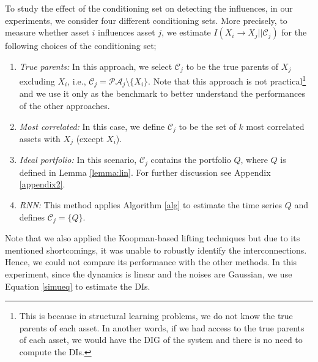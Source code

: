 To study the effect of the conditioning set on detecting the influences, in our experiments, we consider four different conditioning sets.
More precisely, to measure whether asset $i$ influences asset $j$, we estimate $I(X_i\rightarrow X_j||\mathcal{C}_j)$ for the following choices of the conditioning set; 
\begin{enumerate}
    \item \textit{True parents:} In this approach, we select $\mathcal{C}_j$ to be the true parents of $X_j$ excluding $X_i$, i.e., $\mathcal{C}_j=\mathcal{PA}_{j}\setminus\{X_i\}$.
    Note that this approach is not practical\footnote{This is because in structural learning problems, we do not know the true parents of each asset. In another words, if we had access to the true parents of each asset, we would have the DIG of the system and there is no need to compute the DIs.} and we use it only as the benchmark to better understand the performances of the other approaches. 
    
    \item \textit{Most correlated:} In this case, we define $\mathcal{C}_j$ to be the set of $k$ most correlated assets with $X_j$ (except $X_i$).
    
    \item \textit{Ideal portfolio:} In this scenario, $\mathcal{C}_j$ contains the portfolio $Q$, where $Q$ is defined in Lemma \ref{lemma:lin}.
    For further discussion see Appendix \ref{appendix2}. 
    
    \item \textit{RNN:} This method applies Algorithm \ref{alg} to estimate the time series $Q$ and defines $\mathcal{C}_j=\{Q\}$.
    
\end{enumerate}
Note that we also applied the Koopman-based lifting techniques but due to its mentioned shortcomings, it was unable to robustly identify the interconnections. 
Hence, we could not compare its performance with the other methods. 
In this experiment, since the dynamics is linear and the noises are Gaussian, we use Equation \eqref{simueq} to estimate the DIs. 
